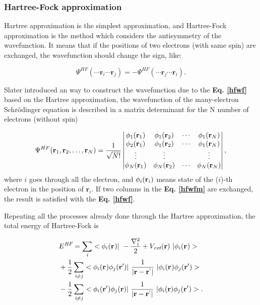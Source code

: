 \documentclass[a4paper, 12pt, titlepage,oneside,drop]{kthesis}
\begin{document}
\subsubsection{Hartree-Fock approximation}
Hartree approximation is the simplest approximation, and Hartree-Fock approximation is the method which considers the 
antisymmetry of the wavefunction. It means that if the positions of two electrons (with same spin) are exchanged, the wavefunction should change the sign, like:

\begin{equation}\label{hfwf}
\Psi^\textit{HF} ( \cdots \textbf{r}_\textit{i} \cdots  \textbf{r}_\textit{j} ) = - \Psi^\textit{HF} ( \cdots \textbf{r}_\textit{j} \cdots  \textbf{r}_\textit{i} ).
\end{equation}

Slater introduced an way to construct the wavefunction due to the \textbf{Eq. \ref{hfwf}} based on the Hartree approximation, 
the wavefunction of the many-electron Schrödinger equation is described in a matrix determinant for the N number of electrons 
(without spin)

\begin{equation}\label{hfwfm}
\Psi^{HF}(\mathbf{r}_1, \mathbf{r}_2, \ldots, \mathbf{r}_N) =
\frac{1}{\sqrt{N!}} \left|
\begin{matrix}
    \bwff<1><1> & \bwff<1><2> & \cdots & \bwff<1><N> \\
    \bwff<2><1> & \bwff<1><2> & \cdots & \bwff<1><N> \\
    \vdots               & \vdots               &        & \vdots               \\
    \bwff<N><1> & \bwff<N><2> & \cdots & \bwff<N><N>
\end{matrix} \right|,
\end{equation}
\noindent where $i$ goes through all the electron, and $\bwff<i><i>$ means state of the ($i$)-th electron in the position of $\textbf{r}_\textit{i}$. If two columns in the \textbf{Eq. \ref{hfwfm}} are exchanged, 
the result is satisfied with the \textbf{Eq. \ref{hfwf}}.

Repeating all the processes already done through the Hartree approximation, the total energy of Hartree-Fock is

\begin{equation}\begin{split}
&E^\textit{HF} = \sumi<i> <\bwff<i><> |\ -\frac{\nabla^{2}_{i}}{2} + V_\textit{ext}(\textbf{r})  \ | \bwff<i><> > \\
& + \frac{1}{2} \suminj<i><j> <\bwff<i><> \bwfn<j><'>|\ \frac{1}{|\textbf{r} - \textbf{r}^{'} |} \ | \bwff<i><> \bwfn<j><'>> \\
& - \frac{1}{2} \suminj<i><j> <\bwfn<i><'> \bwfn<j><>|\ \frac{1}{|\textbf{r} - \textbf{r}^{'} |} \ | \bwfn<i><> \bwfn<j><'>>.
\end{split}\end{equation}
\end{document}
